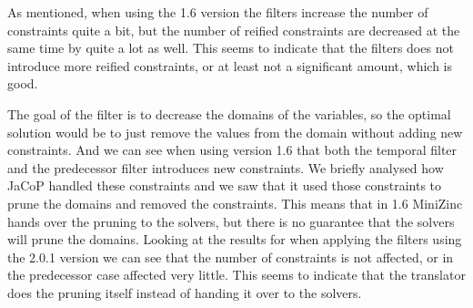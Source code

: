 As mentioned, when using the 1.6 version the filters increase the number of constraints quite a bit, but the number of reified constraints are decreased at the same time by quite a lot as well. This seems to indicate that the filters does not introduce more reified constraints, or at least not a significant amount, which is good.

The goal of the filter is to decrease the domains of the variables, so the optimal solution would be to just remove the values from the domain without adding new constraints. And we can see when using version 1.6 that both the temporal filter and the predecessor filter introduces new constraints. We briefly analysed how JaCoP handled these constraints and we saw that it used those constraints to prune the domains and removed the constraints. This means that in 1.6 MiniZinc hands over the pruning to the solvers, but there is no guarantee that the solvers will prune the domains. Looking at the results for when applying the filters using the 2.0.1 version we can see that the number of constraints is not affected, or in the predecessor case affected very little. This seems to indicate that the translator does the pruning itself instead of handing it over to the solvers.



